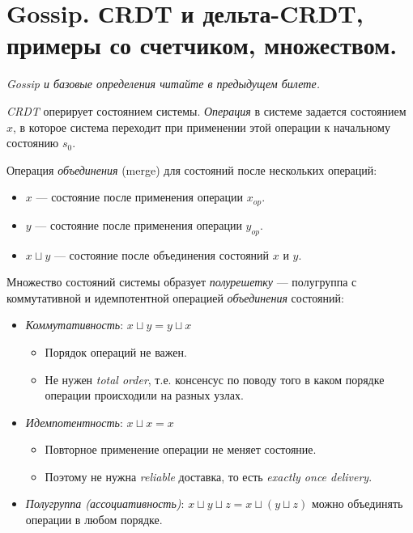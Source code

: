 \section{Gossip. СRDT и дельта-CRDT, примеры со счетчиком, множеством.}

\textit{Gossip и базовые определения читайте в предыдущем билете.}

\begin{definition}
    \textit{CRDT} оперирует состоянием системы.
    \textit{Операция} в системе задается состоянием $x$,
    в которое система переходит при применении этой операции
    к начальному состоянию $s_0$.
\end{definition}

\begin{definition}
    Операция \textit{объединения} (merge) для состояний
    после нескольких операций:
    \begin{itemize}
        \item $x$ --- состояние после применения операции $x_{op}$.
        \item $y$ --- состояние после применения операции $y_{op}$.
        \item $x \sqcup y$ --- состояние после объединения состояний $x$ и $y$.
    \end{itemize}
\end{definition}

\begin{definition}
    Множество состояний системы образует \textit{полурешетку} ---
    полугруппа с коммутативной и идемпотентной
    операцией \textit{объединения} состояний:
    \begin{itemize}
        \item \textit{Коммутативность}: $x \sqcup y = y \sqcup x$
            \begin{itemize}
                \item Порядок операций не важен.
                \item Не нужен \textit{total order}, т.е. консенсус по поводу
                    того в каком порядке операции происходили на разных узлах.
            \end{itemize}
        \item \textit{Идемпотентность}: $x \sqcup x = x$
            \begin{itemize}
                \item Повторное применение операции не меняет состояние.
                \item Поэтому не нужна \textit{reliable} доставка, то есть
                    \textit{exactly once delivery}.
            \end{itemize}
        \item \textit{Полугруппа (ассоциативность)}:
            $x \sqcup y \sqcup z = x \sqcup (y \sqcup z)$
            можно объединять операции в любом порядке.
    \end{itemize}
\end{definition}


